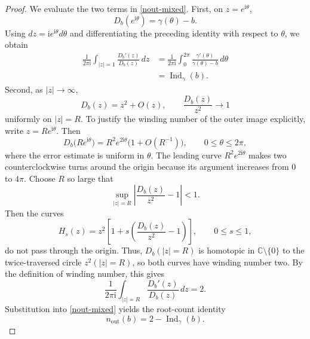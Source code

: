\documentclass[11pt,a4paper]{article}
\theoremstyle{definition}
\begin{document}
\begin{proof}
We evaluate the two terms in \eqref{nout-mixed}. First, on $z=e^{\mathrm{i}\theta}$,
\begin{equation*}
D_b(e^{\mathrm{i}\theta})=\gamma(\theta)-b.
\end{equation*}
Using $dz=\mathrm{i}e^{\mathrm{i}\theta}d\theta$ and differentiating the preceding identity with respect to $\theta$, we obtain
\begin{align*}
\frac{1}{2\pi\mathrm{i}}\int_{|z|=1}\frac{D_b'(z)}{D_b(z)}\,dz
&=\frac{1}{2\pi\mathrm{i}}\int_0^{2\pi}
\frac{\gamma'(\theta)}{\gamma(\theta)-b}\,d\theta\\
&=\operatorname{Ind}_{\gamma}(b).
\end{align*}
Second, as $|z|\to\infty$,
\begin{equation*}
D_b(z)=z^2+O(z),
\qquad
\frac{D_b(z)}{z^2}\longrightarrow1
\end{equation*}
uniformly on $|z|=R$. To justify the winding number of the outer image
explicitly, write $z=Re^{\mathrm{i}\theta}$. Then
\begin{equation*}
D_b\bigl(Re^{\mathrm{i}\theta}\bigr)
=R^2e^{2\mathrm{i}\theta}\bigl(1+O(R^{-1})\bigr),
\qquad 0\leq\theta\leq2\pi,
\end{equation*}
where the error estimate is uniform in $\theta$. The leading curve
$R^2e^{2\mathrm{i}\theta}$ makes two counterclockwise turns around the
origin because its argument increases from $0$ to $4\pi$. Choose $R$ so
large that
\begin{equation*}
\sup_{|z|=R}\left|\frac{D_b(z)}{z^2}-1\right|<1.
\end{equation*}
Then the curves
\begin{equation*}
H_s(z)=z^2\left[1+s\left(\frac{D_b(z)}{z^2}-1\right)\right],
\qquad 0\leq s\leq1,
\end{equation*}
do not pass through the origin. Thus, $D_b(|z|=R)$ is homotopic in
$\mathbb{C}\setminus\{0\}$ to the twice-traversed circle $z^2(|z|=R)$,
so both curves have winding number two. By the definition of winding
number, this gives
\begin{equation*}
\frac{1}{2\pi\mathrm{i}}\int_{|z|=R}\frac{D_b'(z)}{D_b(z)}\,dz=2.
\end{equation*}
Substitution into \eqref{nout-mixed} yields the root-count identity
\begin{equation}\label{root-count-mixed}
n_{\mathrm{out}}(b)=2-\operatorname{Ind}_{\gamma}(b).
\end{equation}


\end{proof}
\end{document}
